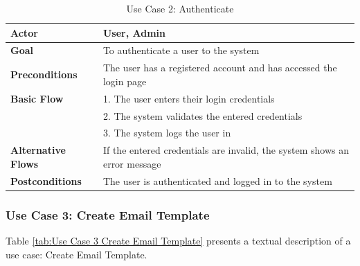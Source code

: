 \begin{table}[ht]
	\centering
	\begin{tabularx}{\textwidth}{|l|X|}
		\hline
		\textbf{Actor}             & User, Admin                                                               \\
		\hline
		\textbf{Goal}              & To authenticate a user to the system                                      \\
		\hline
		\textbf{Preconditions}     & The user has a registered account and has accessed the login page         \\
		\hline
		\textbf{Basic Flow}        & 1. The user enters their login credentials                                \\
		                           & 2. The system validates the entered credentials                           \\
		                           & 3. The system logs the user in                                            \\
		\hline
		\textbf{Alternative Flows} & If the entered credentials are invalid, the system shows an error message \\
		\hline
		\textbf{Postconditions}    & The user is authenticated and logged in to the system                     \\
		\hline
	\end{tabularx}
	\caption{Use Case 2: Authenticate}
	\label{tab:Use Case 2 Authenticate}
\end{table}

\subsubsection{Use Case 3: Create Email Template}

Table \ref{tab:Use Case 3 Create Email Template} presents a textual description of a use case: Create Email Template.

